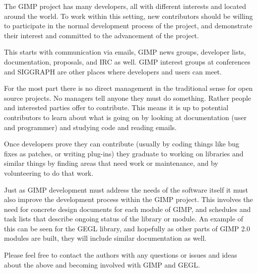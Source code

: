 The GIMP project has many developers, all with different interests and located
around the world. To work within this setting, new contributors should be
willing to participate in the normal development process of the project, and
demonstrate their interest and committed to the advancement of the project.  

This starts with communication via emails, GIMP news groups, developer lists,
documentation, proposals, and IRC as well. GIMP interest groups at conferences
and SIGGRAPH are other places where developers and users can meet.  

For the most part there is no direct management in the traditional sense for
open source projects. No managers tell anyone they must do something.  Rather
people and interested parties offer to contribute. This means it is up to
potential contributors to learn about what is going on by looking at
documentation (user and programmer) and studying code and reading emails. 

Once developers prove they can contribute (usually by coding things like
bug fixes as patches, or writing plug-ins) they graduate to working on libraries
and similar things by finding areas that need work or maintenance, and by
volunteering to do that work.

Just as GIMP development must address the needs of the software itself it must
also improve the development process within the GIMP project. This involves the
need for concrete design documents for each module of GIMP, and schedules and
task lists that describe ongoing status of the library or module. An example of
this can be seen for the GEGL library, and hopefully as other parts of GIMP 2.0
modules are built, they will include similar documentation as well.

Please feel free to contact the authors with any questions or issues and ideas
about the above and becoming involved with GIMP and GEGL.
